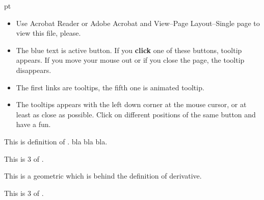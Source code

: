 \documentclass{article}
\def\Message#1{\colorbox{bkg}{
      \begin{minipage}{1\linewidth}
        \smallskip
      #1
        \smallskip
      \end{minipage}
 }}
\begin{document}
 pt

\Message{
\begin{itemize}
\item Use Acrobat Reader or Adobe Acrobat and View--Page
  Layout--Single page to view this file, please.
\item The blue text is active button. If you \textbf{click} one of
  these buttons, tooltip appears. If you move your mouse out or if you
  close the page, the tooltip disappears.
\item The first links are tooltips, the fifth one is animated tooltip.
\item The tooltips appears with the left down corner at the mouse
  cursor, or at least as close as possible. Click on different
  positions of the same button and have a fun.
\end{itemize}
}

\begin{definice}
  This is definition of  . bla bla bla.
\end{definice}

\begin{definice}
  This is 3 of \hfill
  .
\end{definice}

\pause
This is a geometric  which is behind the
definition of derivative.


\pause
\vfill 
\begin{definice}
  This is 3 of \hfill
  .
\end{definice}
\end{document}
